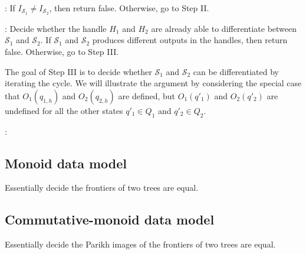 \documentclass[runningheads,a4paper]{llncs}
\newcommand\Ss{\mathcal{S}}
\begin{document}
\smallskip

: If $I_{\Ss_1} \neq I_{\Ss_2}$, then return false. Otherwise, go to Step II.

\smallskip

: Decide whether the handle $H_1$ and $H_2$ are already able to differentiate between $\Ss_1$ and $\Ss_2$. If $\Ss_1$ and $\Ss_2$ produces different outputs in the handles, then return false. Otherwise, go to Step III.

\smallskip

The goal of Step III is to decide whether $\Ss_1$ and $\Ss_2$ can be differentiated by iterating the cycle. We will illustrate the argument by considering the special case that $O_1(q_{1,h})$ and $O_2(q_{2,h})$ are defined, but $O_1(q'_1)$ and $O_2(q'_2)$ are undefined  for all the other states $q'_1  \in Q_1$ and $q'_2 \in Q_2$.


\smallskip

: 



\subsection{Monoid data model}

Essentially decide the frontiers of two trees are equal.

\subsection{Commutative-monoid data model}

Essentially decide the Parikh images of the frontiers of two trees are equal. 
\end{document}
